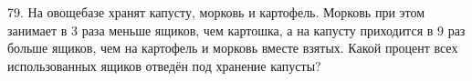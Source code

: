 79. На овощебазе хранят капусту, морковь и картофель. Морковь при этом занимает в 3 раза меньше ящиков, чем картошка, а на капусту приходится в 9 раз больше ящиков, чем на картофель и морковь вместе взятых. Какой процент всех использованных ящиков отведён под хранение капусты?\\
